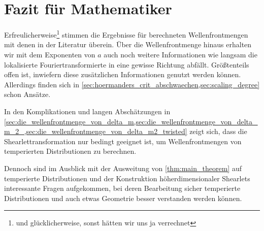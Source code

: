 \section{Fazit für Mathematiker} %
\label{sec:fazit_für_mathematiker}


Erfreulicherweise\footnote{und glücklicherweise, sonst hätten wir uns ja verrechnet} stimmen die Ergebnisse für berechneten Wellenfrontmengen mit denen in der Literatur überein. Über die Wellenfrontmenge hinaus erhalten wir mit dem Exponenten von $a$ auch noch weitere Informationen wie langsam die lokalisierte Fouriertransformierte in eine gewisse Richtung abfällt. Größtenteils offen ist, inwiefern diese zusätzlichen Informationen genutzt werden können. Allerdings finden sich in \cref{sec:hoermanders_crit_abschwaechen,sec:scaling_degree} schon Ansätze.

In den Komplikationen und langen Abschätzungen in \cref{sec:die_wellenfrontmenge_von_delta_m,sec:die_wellenfrontmenge_von_delta_m_2_,sec:die_wellenfrontmenge_von_delta_m2_twisted} zeigt sich, dass die Shearlettransformation nur bedingt geeignet ist, um Wellenfrontmengen von temperierten Distributionen zu berechnen.

Dennoch sind im Ausblick mit der Ausweitung von \cref{thm:main_theorem} auf temperierte Distributionen und  der Konstruktion höherdimensionaler Shearlets interessante Fragen aufgekommen, bei deren Bearbeitung sicher temperierte Distributionen und auch etwas Geometrie besser verstanden werden können.


